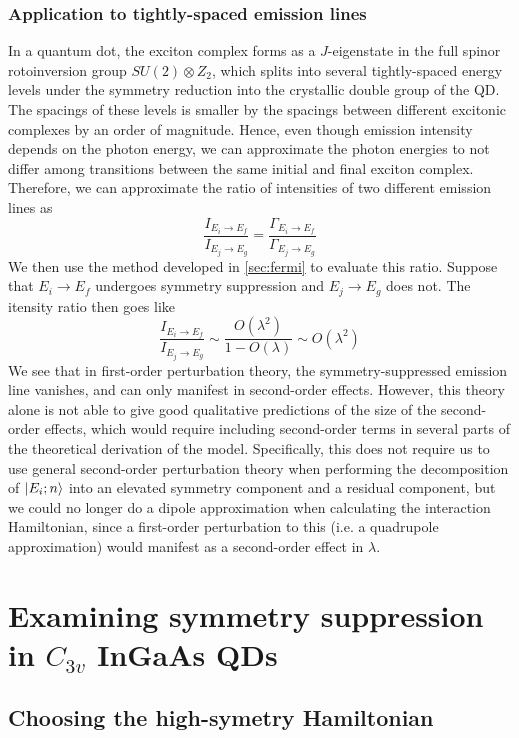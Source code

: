 \documentclass[12pt]{article}
\begin{document}
	\subsubsection{Application to tightly-spaced emission lines}
	In a quantum dot, the exciton complex forms as a $J$-eigenstate in the full spinor rotoinversion group $SU(2)\otimes Z_2$, which splits into several tightly-spaced energy levels under the symmetry reduction into the crystallic double group of the QD. The spacings of these levels is smaller by the spacings between different excitonic complexes by an order of magnitude. Hence, even though emission intensity depends on the photon energy, we can approximate the photon energies to not differ among transitions between the same initial and final exciton complex. Therefore, we can approximate the ratio of intensities of two different emission lines as
	$$\frac{I_{E_i\to E_f}}{I_{E_j\to E_g}}=\frac{\Gamma_{E_i\to E_f}}{\Gamma_{E_j\to E_g}}$$
	We then use the method developed in \ref{sec:fermi} to evaluate this ratio. Suppose that $E_i\to E_f$ undergoes symmetry suppression and $E_j\to E_g$ does not. The itensity ratio then goes like
	$$\frac{I_{E_i\to E_f}}{I_{E_j\to E_g}}\sim \frac{O(\lambda^2)}{1-O(\lambda)}\sim O(\lambda^2)$$
	We see that in first-order perturbation theory, the symmetry-suppressed emission line vanishes, and can only manifest in second-order effects. However, this theory alone is not able to give good qualitative predictions of the size of the second-order effects, which would require including second-order terms in several parts of the theoretical derivation of the model. Specifically, this does not require us to use general second-order perturbation theory when performing the decomposition of $\ket{E_i;n}$ into an elevated symmetry component and a residual component, but we could no longer do a dipole approximation when calculating the interaction Hamiltonian, since a first-order perturbation to this (i.e. a quadrupole approximation) would manifest as a second-order effect in $\lambda$.
	
	\section{Examining symmetry suppression in $C_{3v}$ InGaAs QDs}
	
	\subsection{Choosing the high-symetry Hamiltonian}
	
\end{document}
